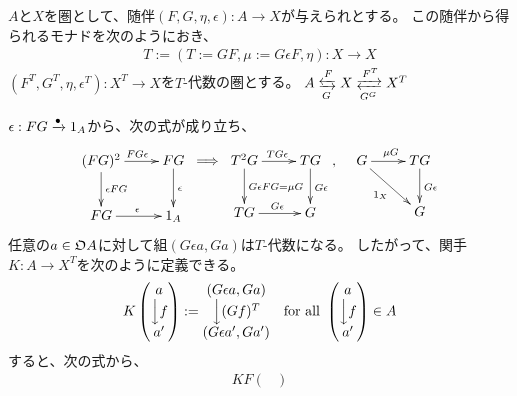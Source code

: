 {	$A$と$X$を圏として、随伴$(F,G,\eta,\epsilon):A\to X$が与えられとする。
	この随伴から得られるモナドを次のようにおき、
	\begin{equation*}\begin{split}
		T:=(T:=GF, \mu:=G\epsilon F, \eta): X\to X
	\end{split}\end{equation*}
	$(F^T,G^T,\eta,\epsilon^T):X^T\to X$を$T$-代数の圏とする。
	$A \xfromto{F}{G} X \xtofrom{F^T}{G^G} X^T$

	$\epsilon:FG\xrightarrow[{}]{\bullet}1_A$から、次の式が成り立ち、
	\begin{equation*}\begin{split}
		\xymatrix{
			(FG)^2 \ar[r]^{FG\epsilon} \ar[d]^{\epsilon FG} 
			& FG \ar[d]^{\epsilon} \\
			FG \ar[r]^{\epsilon} & 1_A \\
		}\implies \xymatrix{
			T^2G \ar[r]^{TG\epsilon} \ar[d]^{G\epsilon FG = \mu G} 
			& TG \ar[d]^{G\epsilon} \\
			TG \ar[r]^{G\epsilon} & G \\
		},\quad \xymatrix{
			G \ar[r]^{\mu G} \ar[dr]_{1_X} & TG \ar[d]^{G\epsilon} \\
			& G
		}
	\end{split}\end{equation*}
	任意の$a\in\mathfrak{O} A$に対して組$(G\epsilon a,Ga)$は$T$-代数になる。
	したがって、関手$K:A\to X^T$を次のように定義できる。
	\begin{equation*}\begin{split}
		K\begin{pmatrix}
			a \\ \Big\downarrow{f} \\ a'
		\end{pmatrix} := \begin{matrix}
			(G\epsilon a, Ga) \\ \Big\downarrow{(Gf)^T} \\ (G\epsilon a', Ga')
		\end{matrix} \quad\text{for all } \begin{pmatrix}
			a \\ \Big\downarrow{f} \\ a'
		\end{pmatrix} \in A
	\end{split}\end{equation*}
	すると、次の式から、
	\begin{equation*}\begin{split}
		KF\begin{pmatrix}

\end{pmatrix}
\end{split}
\end{equation*}}
